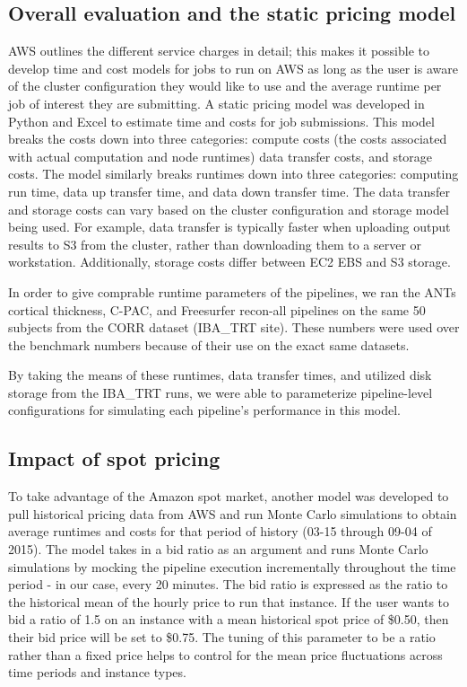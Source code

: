 \documentclass{frontiersSCNS} %
\begin{document}
\subsection{Overall evaluation and the static pricing model}

AWS outlines the different service charges in detail; this makes it possible to develop time and cost models for jobs to run on AWS as long as the user is aware of the cluster configuration they would like to use and the average runtime per job of interest they are submitting. A static pricing model was developed in Python and Excel to estimate time and costs for job submissions. This model breaks the costs down into three categories: compute costs (the costs associated with actual computation and node runtimes) data transfer costs, and storage costs. The model similarly breaks runtimes down into three categories: computing run time, data up transfer time, and data down transfer time. The data transfer and storage costs can vary based on the cluster configuration and storage model being used. For example, data transfer is typically faster when uploading output results to S3 from the cluster, rather than downloading them to a server or workstation. Additionally, storage costs differ between EC2 EBS and S3 storage.

In order to give comprable runtime parameters of the pipelines, we ran the ANTs cortical thickness, C-PAC, and Freesurfer recon-all pipelines on the same 50 subjects from the CORR dataset (IBA\_TRT site). These numbers were used over the benchmark numbers because of their use on the exact same datasets.

By taking the means of these runtimes, data transfer times, and utilized disk storage from the IBA\_TRT runs, we were able to parameterize pipeline-level configurations for simulating each pipeline's performance in this model.

\subsection{Impact of spot pricing}
To take advantage of the Amazon spot market, another model was developed to pull historical pricing data from AWS and run Monte Carlo simulations to obtain average runtimes and costs for that period of history (03-15 through 09-04 of 2015). The model takes in a bid ratio as an argument and runs Monte Carlo simulations by mocking the pipeline execution incrementally throughout the time period - in our case, every 20 minutes. The bid ratio is expressed as the ratio to the historical mean of the hourly price to run that instance. If the user wants to bid a ratio of 1.5 on an instance with a mean historical spot price of \$0.50, then their bid price will be set to \$0.75. The tuning of this parameter to be a ratio rather than a fixed price helps to control for the mean price fluctuations across time periods and instance types.
\end{document}
